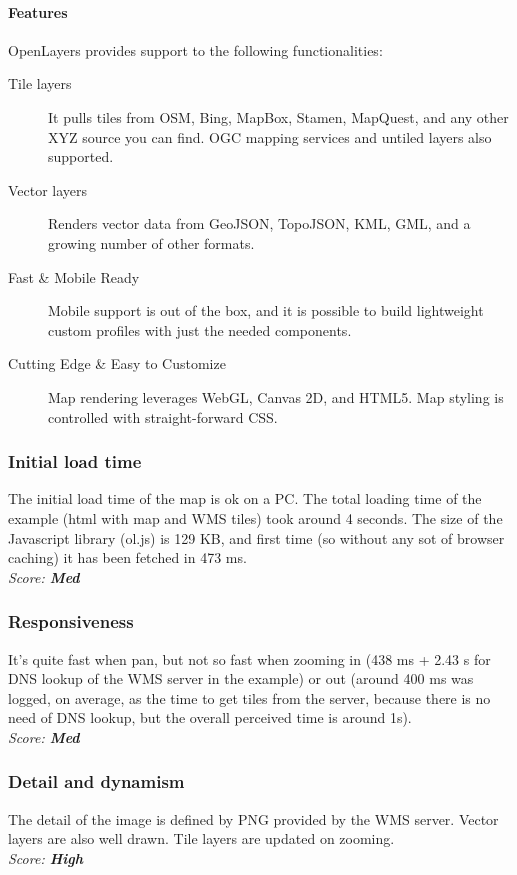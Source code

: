 \documentclass[11pt,a4paper,titlepage,oneside]{report}
\begin{document}
   \paragraph{Features}
   OpenLayers provides support to the following functionalities:
   \begin{description}
     \item[Tile layers] It pulls tiles from OSM, Bing, MapBox, Stamen, MapQuest, and any other XYZ source you can find. OGC mapping services and untiled layers also supported.
     \item[Vector layers] Renders vector data from GeoJSON, TopoJSON, KML, GML, and a growing number of other formats.
     \item[Fast \& Mobile Ready] Mobile support is out of the box, and it is possible to build lightweight custom profiles with just the needed components.
     \item[Cutting Edge \& Easy to Customize] Map rendering leverages WebGL, Canvas 2D, and HTML5. Map styling is controlled with straight-forward CSS.
   \end{description}
   \subsubsection{Initial load time}
   The initial load time of the map is ok on a PC. The total loading time of the example (html with map and WMS tiles) took around 4 seconds. The size of the Javascript library (ol.js) is 129 KB, and first time (so without any sot of browser caching) it has been fetched in 473 ms.
   \\ \emph{Score: \textbf{Med}}
   \subsubsection{Responsiveness}
   It's quite fast when pan, but not so fast when zooming in (438 ms + 2.43 s for DNS lookup of the WMS server in the example) or out (around 400 ms was logged, on average, as the time to get tiles from the server, because there is no need of DNS lookup, but the overall perceived time is around 1s).
   \\ \emph{Score: \textbf{Med}}
   \subsubsection{Detail and dynamism}
   The detail of the image is defined by PNG provided by the WMS server. Vector layers are also well drawn. Tile layers are updated on zooming.
   \\ \emph{Score: \textbf{High}}
\end{document}
